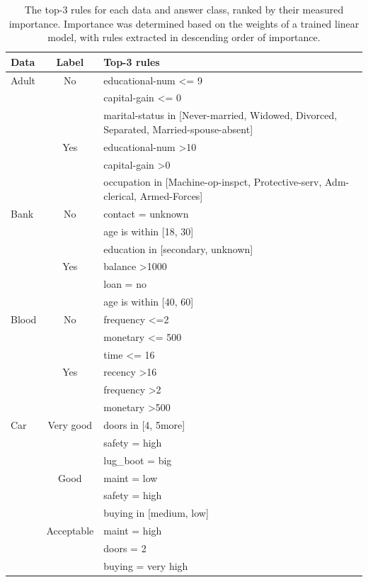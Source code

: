 \documentclass{article}
\theoremstyle{plain}
\theoremstyle{definition}
\theoremstyle{remark}
\begin{document}
{\small
\begin{longtable}{lcl}
\caption{The top-3 rules for each data and answer class, ranked by their measured importance. Importance was determined based on the weights of a trained linear model, with rules extracted in descending order of importance.}
\label{tab:appendix_Qualitative} \\
\toprule
Data & Label & Top-3 rules \\ \midrule
\endfirsthead
%
\endhead
%
\hline
\endfoot
%
\endlastfoot
%
Adult & No & educational-num \textless{}= 9 \\
 &  & capital-gain \textless{}= 0 \\
 &  & marital-status in {[}Never-married, Widowed, Divorced, Separated, Married-spouse-absent{]} \\
 & Yes & educational-num \textgreater 10 \\
 &  & capital-gain \textgreater 0 \\
 &  & occupation in {[}Machine-op-inspct, Protective-serv, Adm-clerical, Armed-Forces{]} \\ \midrule
Bank & No & contact = unknown \\
 &  & age is within {[}18, 30{]} \\
 &  & education in {[}secondary, unknown{]} \\
 & Yes & balance \textgreater 1000 \\
 &  & loan = no \\
 &  & age is within {[}40, 60{]} \\ \midrule
Blood & No & frequency \textless{}=2 \\
 &  & monetary \textless{}= 500 \\
 &  & time \textless{}= 16 \\
 & Yes & recency \textgreater 16 \\
 &  & frequency \textgreater 2 \\
 &  & monetary \textgreater 500 \\ \midrule
Car & Very good & doors in {[}4, 5more{]} \\
 &  & safety = high \\
 &  & lug\_boot = big \\
 & Good & maint = low \\
 &  & safety = high \\
 &  & buying in {[}medium, low{]} \\
 & Acceptable & maint = high \\
 &  & doors = 2 \\
 &  & buying = very high \\

\end{longtable}}
\end{document}
